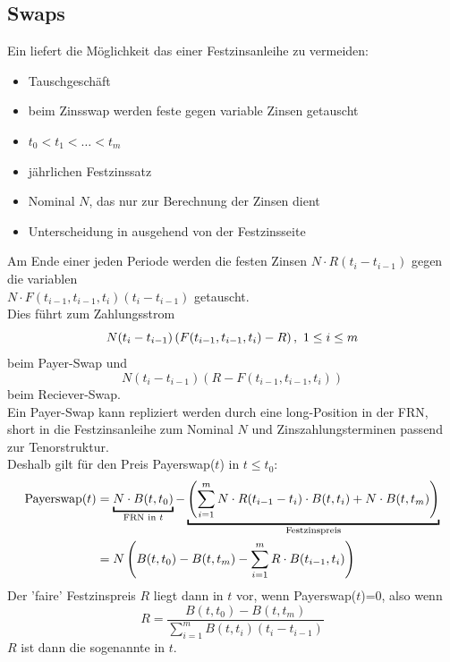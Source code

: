 \subsection{Swaps}
\label{sub:swaps}
Ein  liefert die Möglichkeit das  einer Festzinsanleihe zu vermeiden:\\
\begin{itemize}
	\item Tauschgeschäft
	\item beim Zinsswap werden feste gegen variable Zinsen getauscht
	\item {} $t_0<t_1<\dots<t_m$
	\item jährlichen Festzinssatz
	\item Nominal $N$, das nur zur Berechnung der Zinsen dient
	\item Unterscheidung in   ausgehend von der Festzinsseite
\end{itemize}
Am Ende einer jeden Periode werden die festen Zinsen $N\cdot R(t_i-t_{i-1})$ gegen die variablen\\ 
$N\cdot F(t_{i-1},t_{i-1},t_i)(t_i-t_{i-1})$ getauscht.\\
Dies führt zum Zahlungsstrom
\[
N(t_i-t_{i-1})\left( F(t_{i-1},t_{i-1},t_i)-R\right),~1\le i\le m 
\]
beim Payer-Swap und
\[
N(t_i-t_{i-1})(R-F(t_{i-1},t_{i-1},t_i)) 
\]
beim Reciever-Swap.\\
Ein Payer-Swap kann repliziert werden durch eine long-Position in der FRN, short in die Festzinsanleihe zum Nominal $N$ und Zinszahlungsterminen passend zur Tenorstruktur.\\
Deshalb gilt für den Preis Payerswap($t$) in $t\le t_0$:\\
\begin{equation*}
\begin{aligned}
	\text{Payerswap}(t) &= \underbracket{N\cdot B(t,t_0)}_{\text{FRN in }t}-\underbracket{\enbrace{\sum_{i=1}^{m}N\cdot R(t_{i-1}-t_i) \cdot B(t,t_i)+N\cdot B(t,t_m)}}_{\text{Festzinspreis}}\\
	&=N\enbrace{B(t,t_0)-B(t,t_m)-\sum_{i=1}^{m}R\cdot B(t_{i-1},t_i)}
\end{aligned}
\end{equation*}
Der 'faire' Festzinspreis $R$ liegt dann in $t$ vor, wenn Payerswap($t$)=0, also wenn
\[
R= \frac{B(t,t_0)-B(t,t_m)}{\sum_{i=1}^{m}B(t,t_i)(t_i-t_{i-1})} 
\]
$R$ ist dann die sogenannte  in $t$.

